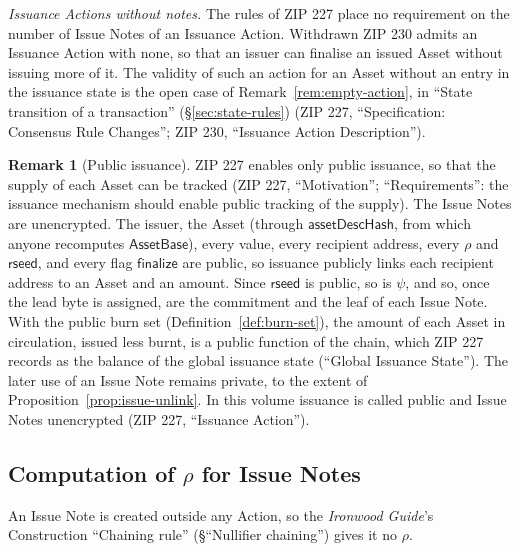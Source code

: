 \documentclass[11pt,a4paper]{article}
\theoremstyle{definition}
\newtheorem{remark}[theorem]{Remark}
\begin{document}
\emph{Issuance Actions without notes.} The rules of ZIP 227 place no
requirement on the number of Issue Notes of an Issuance Action. Withdrawn
ZIP 230 admits an Issuance Action with none, so that an issuer can finalise
an issued Asset without issuing more of it. The validity of such an action
for an Asset without an entry in the issuance state is the open case of
Remark~\ref{rem:empty-action}, in ``State transition of a transaction''
(\S\ref{sec:state-rules}) (ZIP 227, ``Specification: Consensus Rule
Changes''; ZIP 230, ``Issuance Action Description'').

\begin{remark}[Public issuance]\label{rem:public-issuance}
ZIP 227 enables only public issuance, so that the supply of each Asset can
be tracked (ZIP 227, ``Motivation''; ``Requirements'': the issuance
mechanism should enable public tracking of the supply). The Issue Notes are
unencrypted. The issuer, the Asset (through $\mathsf{assetDescHash}$, from
which anyone recomputes $\mathsf{AssetBase}$), every value, every recipient
address, every $\rho$ and $\mathsf{rseed}$, and every flag
$\mathsf{finalize}$ are public, so issuance publicly links each recipient
address to an Asset and an amount. Since $\mathsf{rseed}$ is public, so is
$\psi$, and so, once the lead byte is assigned, are the commitment and the
leaf of each Issue Note. With the public burn set
(Definition~\ref{def:burn-set}), the amount of each Asset in circulation,
issued less burnt, is a public function of the chain, which ZIP 227 records
as the balance of the global issuance state (``Global Issuance State''). The
later use of an Issue Note remains private, to the extent of
Proposition~\ref{prop:issue-unlink}. In this volume issuance is called
public and Issue Notes unencrypted (ZIP 227, ``Issuance Action'').
\end{remark}

\subsection{Computation of \texorpdfstring{$\rho$}{rho} for Issue Notes}
\label{sec:issue-rho}

An Issue Note is created outside any Action, so the \emph{Ironwood Guide}'s
Construction ``Chaining rule'' (\S``Nullifier chaining'') gives it no
$\rho$.
\end{document}
